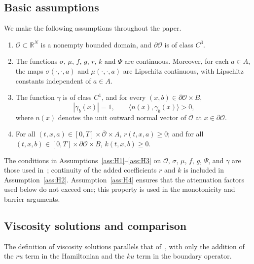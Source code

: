 \documentclass[11pt]{article}
\theoremstyle{definition}
\theoremstyle{remark}
\newcommand{\cO}{\mathcal{O}}
\begin{document}
	
	\subsection{Basic assumptions}
	
	We make the following assumptions throughout the paper.
	
	
	\begin{enumerate}[
		label=\arabic*.,
		ref=\arabic*,
		labelsep=1em,
		leftmargin=*,
		itemindent=0pt
		]
		\item \label{ass:H1}
		$\mathcal{O}\subset\mathbb{R}^N$ is a nonempty bounded domain, and $\partial\mathcal{O}$ is of class $C^3$.
		
		\item \label{ass:H2}
		The functions $\sigma$, $\mu$, $f$, $g$, $r$, $k$ and $\Psi$ are continuous. Moreover, for each $a\in A$, the maps $\sigma(\cdot,\cdot,a)$ and $\mu(\cdot,\cdot,a)$ are Lipschitz continuous, with Lipschitz constants independent of $a\in A$.
		
		\item \label{ass:H3}
		The function $\gamma$ is of class $C^1$, and for every $(x,b)\in\partial\mathcal{O}\times B$,
		\begin{equation}
			|\gamma_b(x)|=1,\qquad \langle n(x),\gamma_b(x)\rangle > 0,
			\label{eq:gamma-cond}
		\end{equation}
		where $n(x)$ denotes the unit outward normal vector of $\overline{\mathcal{O}}$ at $x\in\partial\mathcal{O}$.
		
		\item \label{ass:H4}
		For all $(t,x,a)\in[0,T]\times\overline{\mathcal{O}}\times A$, $r(t,x,a)\ge 0$; and for all $(t,x,b)\in[0,T]\times\partial\mathcal{O}\times B$, $k(t,x,b)\ge 0$.
	\end{enumerate}
	The conditions in Assumptions~\ref{ass:H1}--\ref{ass:H3} on $\cO$, $\sigma$, $\mu$, $f$, $g$, $\Psi$, and $\gamma$ are those used in~\cite{CalzolaEtAl2023}; continuity of the added coefficients $r$ and $k$ is included in Assumption~\ref{ass:H2}.  Assumption~\ref{ass:H4} ensures that the attenuation factors used below do not exceed one; this property is used in the monotonicity and barrier arguments.
	
	
	\subsection{Viscosity solutions and comparison}
	
	The definition of viscosity solutions parallels that of~\cite{CalzolaEtAl2023}, with only the addition of the $ru$ term in the Hamiltonian and the $ku$ term in the boundary operator.
	
\end{document}
